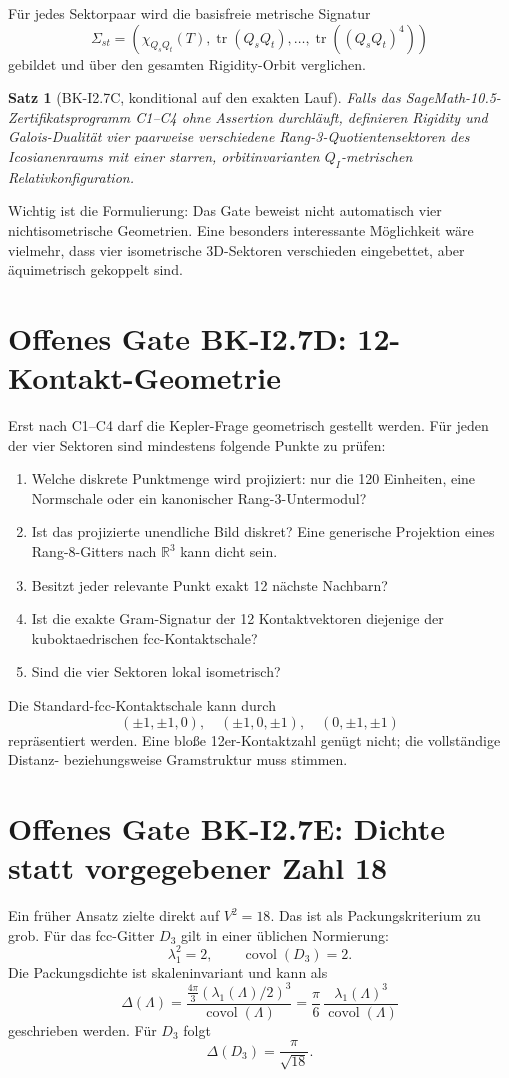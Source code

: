 \documentclass[11pt,a4paper]{article}
\newtheorem{theorem}{Satz}[section]
\theoremstyle{definition}
\theoremstyle{remark}
\newcommand{\RR}{\mathbb R}
\begin{document}
Für jedes Sektorpaar wird die basisfreie metrische Signatur
\[
\Sigma_{st}
=
\left(
\chi_{Q_sQ_t}(T),
\operatorname{tr}(Q_sQ_t),
\ldots,
\operatorname{tr}((Q_sQ_t)^4)
\right)
\]
gebildet und über den gesamten Rigidity-Orbit verglichen.

\begin{theorem}[BK-I2.7C, konditional auf den exakten Lauf]
Falls das SageMath-10.5-Zertifikatsprogramm C1--C4 ohne Assertion durchläuft, definieren Rigidity und Galois-Dualität vier paarweise verschiedene Rang-3-Quotientensektoren des Icosianenraums mit einer starren, orbitinvarianten $Q_I$-metrischen Relativkonfiguration.
\end{theorem}

Wichtig ist die Formulierung: Das Gate beweist nicht automatisch vier nichtisometrische Geometrien. Eine besonders interessante Möglichkeit wäre vielmehr, dass vier isometrische 3D-Sektoren verschieden eingebettet, aber äquimetrisch gekoppelt sind.

\section{Offenes Gate BK-I2.7D: 12-Kontakt-Geometrie}
Erst nach C1--C4 darf die Kepler-Frage geometrisch gestellt werden. Für jeden der vier Sektoren sind mindestens folgende Punkte zu prüfen:
\begin{enumerate}
\item Welche diskrete Punktmenge wird projiziert: nur die 120 Einheiten, eine Normschale oder ein kanonischer Rang-3-Untermodul?
\item Ist das projizierte unendliche Bild diskret? Eine generische Projektion eines Rang-8-Gitters nach $\RR^3$ kann dicht sein.
\item Besitzt jeder relevante Punkt exakt 12 nächste Nachbarn?
\item Ist die exakte Gram-Signatur der 12 Kontaktvektoren diejenige der kuboktaedrischen fcc-Kontaktschale?
\item Sind die vier Sektoren lokal isometrisch?
\end{enumerate}

Die Standard-fcc-Kontaktschale kann durch
\[
(\pm1,\pm1,0),\quad
(\pm1,0,\pm1),\quad
(0,\pm1,\pm1)
\]
repräsentiert werden. Eine bloße 12er-Kontaktzahl genügt nicht; die vollständige Distanz- beziehungsweise Gramstruktur muss stimmen.

\section{Offenes Gate BK-I2.7E: Dichte statt vorgegebener Zahl 18}
Ein früher Ansatz zielte direkt auf $V^2=18$. Das ist als Packungskriterium zu grob. Für das fcc-Gitter $D_3$ gilt in einer üblichen Normierung:
\[
\lambda_1^2=2,\qquad
\operatorname{covol}(D_3)=2.
\]
Die Packungsdichte ist skaleninvariant und kann als
\[
\Delta(\Lambda)
=
\frac{\frac{4\pi}{3}\left(\lambda_1(\Lambda)/2\right)^3}
{\operatorname{covol}(\Lambda)}
=
\frac{\pi}{6}\,
\frac{\lambda_1(\Lambda)^3}{\operatorname{covol}(\Lambda)}
\]
geschrieben werden.
Für $D_3$ folgt
\[
\Delta(D_3)=\frac{\pi}{\sqrt{18}}.
\]
\end{document}
